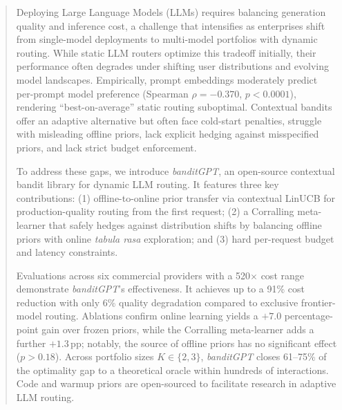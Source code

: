 \begin{abstract}
Deploying Large Language Models (LLMs) requires balancing generation quality and inference cost, a challenge that intensifies as enterprises shift from single-model deployments to multi-model portfolios with dynamic routing. While static LLM routers optimize this tradeoff initially, their performance often degrades under shifting user distributions and evolving model landscapes. Empirically, prompt embeddings moderately predict per-prompt model preference (Spearman $\rho{=}{-}0.370$, $p{<}0.0001$), rendering ``best-on-average'' static routing suboptimal. Contextual bandits offer an adaptive alternative but often face cold-start penalties, struggle with misleading offline priors, lack explicit hedging against misspecified priors, and lack strict budget enforcement.

To address these gaps, we introduce \textit{banditGPT}, an open-source contextual bandit library for dynamic LLM routing. It features three key contributions: (1) offline-to-online prior transfer via contextual LinUCB for production-quality routing from the first request; (2) a Corralling meta-learner that safely hedges against distribution shifts by balancing offline priors with online \textit{tabula rasa} exploration; and (3) hard per-request budget and latency constraints.

Evaluations across six commercial providers with a 520$\times$ cost range demonstrate \textit{banditGPT}'s effectiveness. It achieves up to a 91\% cost reduction with only 6\% quality degradation compared to exclusive frontier-model routing. Ablations confirm online learning yields a $+7.0$ percentage-point gain over frozen priors, while the Corralling meta-learner adds a further $+1.3$\,pp; notably, the source of offline priors has no significant effect ($p{>}0.18$). Across portfolio sizes $K{\in}\{2, 3\}$, \textit{banditGPT} closes 61--75\% of the optimality gap to a theoretical oracle within hundreds of interactions. Code and warmup priors are open-sourced to facilitate research in adaptive LLM routing.
\end{abstract}
